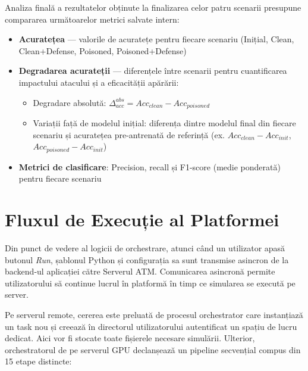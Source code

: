 \documentclass[../../main.tex]{subfiles}
\begin{document}
    Analiza finală a rezultatelor obținute la finalizarea celor patru scenarii presupune compararea următoarelor metrici salvate intern:
    \begin{itemize}
        \item \textbf{Acuratețea} --- valorile de acuratețe pentru fiecare scenariu (Inițial, Clean, Clean+Defense, Poisoned, Poisoned+Defense)
        \item \textbf{Degradarea acurateții} --- diferențele între scenarii pentru cuantificarea impactului atacului și a eficacității apărării:
        \begin{itemize}
            \item Degradare absolută: $\Delta_{acc}^{abs} = Acc_{clean} - Acc_{poisoned}$
            \item Variații față de modelul inițial: diferența dintre modelul final din fiecare scenariu și acuratețea pre-antrenată de referință (ex. $Acc_{clean} - Acc_{init}$, $Acc_{poisoned} - Acc_{init}$)
        \end{itemize}
            \item \textbf{Metrici de clasificare}: Precision, recall și F1-score (medie ponderată) pentru fiecare scenariu
    \end{itemize}

    \section{Fluxul de Execuție al Platformei}

    Din punct de vedere al logicii de orchestrare, atunci când un utilizator apasă butonul \textit{Run}, șablonul Python și configurația sa sunt transmise asincron de la backend-ul aplicației către Serverul ATM. Comunicarea asincronă permite utilizatorului să continue lucrul în platformă în timp ce simularea se execută pe server.
    
    Pe serverul remote, cererea este preluată de procesul orchestrator care instanția\-ză un task nou și creează în directorul utilizatorului autentificat un spațiu de lucru dedicat. Aici vor fi stocate toate fișierele necesare simulării. Ulterior, orchestratorul de pe serverul GPU declanșează un pipeline secvențial compus din 15 etape distincte:
\end{document}
